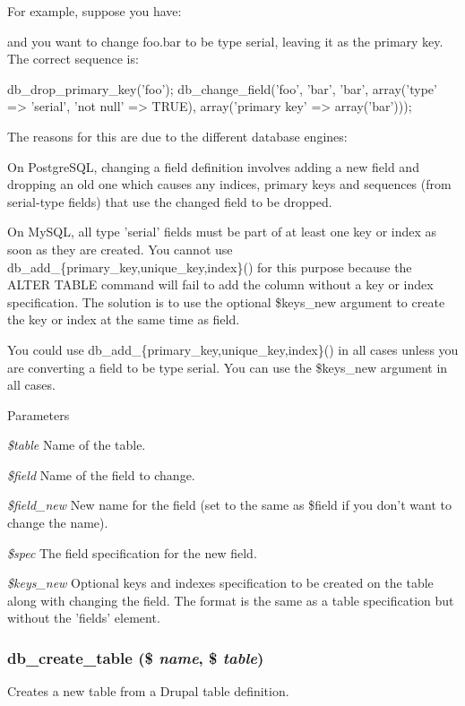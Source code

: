 For example, suppose you have: 
 and you want to change foo.bar to be type serial, leaving it as the primary key. The correct sequence is: 
\begin{DoxyCode}
 db_drop_primary_key('foo');
 db_change_field('foo', 'bar', 'bar',
   array('type' => 'serial', 'not null' => TRUE),
   array('primary key' => array('bar')));
\end{DoxyCode}


The reasons for this are due to the different database engines:

On PostgreSQL, changing a field definition involves adding a new field and dropping an old one which causes any indices, primary keys and sequences (from serial-\/type fields) that use the changed field to be dropped.

On MySQL, all type 'serial' fields must be part of at least one key or index as soon as they are created. You cannot use db\_\-add\_\-\{primary\_\-key,unique\_\-key,index\}() for this purpose because the ALTER TABLE command will fail to add the column without a key or index specification. The solution is to use the optional \$keys\_\-new argument to create the key or index at the same time as field.

You could use db\_\-add\_\-\{primary\_\-key,unique\_\-key,index\}() in all cases unless you are converting a field to be type serial. You can use the \$keys\_\-new argument in all cases.


\begin{DoxyParams}{Parameters}
\item[{\em \$table}]Name of the table. \item[{\em \$field}]Name of the field to change. \item[{\em \$field\_\-new}]New name for the field (set to the same as \$field if you don't want to change the name). \item[{\em \$spec}]The field specification for the new field. \item[{\em \$keys\_\-new}]Optional keys and indexes specification to be created on the table along with changing the field. The format is the same as a table specification but without the 'fields' element. \end{DoxyParams}
\hypertarget{group__schemaapi_gaf3a8307693d6b28374665c72531b429f}{
\subsubsection[{db\_\-create\_\-table}]{\setlength{\rightskip}{0pt plus 5cm}db\_\-create\_\-table (\$ {\em name}, \/  \$ {\em table})}}
\label{group__schemaapi_gaf3a8307693d6b28374665c72531b429f}
Creates a new table from a Drupal table definition.


